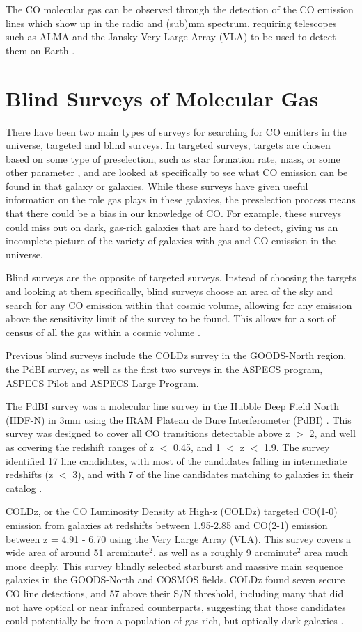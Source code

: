 \documentclass[twoside,single]{lion-msc}
\begin{document}
The CO molecular gas can be observed through the detection of the CO emission lines which show up in the radio and (sub)mm spectrum, requiring telescopes such as ALMA and the Jansky Very Large Array (VLA) to be used to detect them on Earth \cite{decarli2019alma}. 

\section{Blind Surveys of Molecular Gas}

There have been two main types of surveys for searching for CO emitters in the universe, targeted and blind surveys. In targeted surveys, targets are chosen based on some type of preselection, such as star formation rate, mass, or some other parameter \cite{tacconi2018phibss}, and are looked at specifically to see what CO emission can be found in that galaxy or galaxies. While these surveys have given useful information on the role gas plays in these galaxies, the preselection process means that there could be a bias in our knowledge of CO. For example, these surveys could miss out on dark, gas-rich galaxies that are hard to detect, giving us an incomplete picture of the variety of galaxies with gas and CO emission in the universe. 

Blind surveys are the opposite of targeted surveys. Instead of choosing the targets and looking at them specifically, blind surveys choose an area of the sky and search for any CO emission within that cosmic volume, allowing for any emission above the sensitivity limit of the survey to be found. This allows for a sort of census of all the gas within a cosmic volume \cite{decarli2019alma}. 

Previous blind surveys include the COLDz survey in the GOODS-North region, the PdBI survey, as well as the first two surveys in the ASPECS program, ASPECS Pilot and ASPECS Large Program. 

The PdBI survey was a molecular line survey in the Hubble Deep Field North (HDF-N) in 3mm using the IRAM Plateau de Bure Interferometer (PdBI) \cite{decarli2014molecular}. This survey was designed to cover all CO transitions detectable above z $>$ 2, and well as covering the redshift ranges of z $<$ 0.45, and 1 $<$ z $<$ 1.9. The survey identified 17 line candidates, with most of the candidates falling in intermediate redshifts (z $<$ 3), and with 7 of the line candidates matching to galaxies in their catalog \cite{decarli2014molecular}. 

COLDz, or the CO Luminosity Density at High-z (COLDz) targeted CO(1-0) emission from galaxies at redshifts between 1.95-2.85 and CO(2-1) emission between z = 4.91 - 6.70 using the Very Large Array (VLA)\cite{pavesi2018co}. This survey covers a wide area of around 51 arcminute$^2$, as well as a roughly 9 arcminute$^2$ area much more deeply. This survey blindly selected starburst and massive main sequence galaxies in the GOODS-North and COSMOS fields. COLDz found seven secure CO line detections, and 57 above their S/N threshold, including many that did not have optical or near infrared counterparts, suggesting that those candidates could potentially be from a population of gas-rich, but optically dark galaxies \cite{pavesi2018co}.
\end{document}
